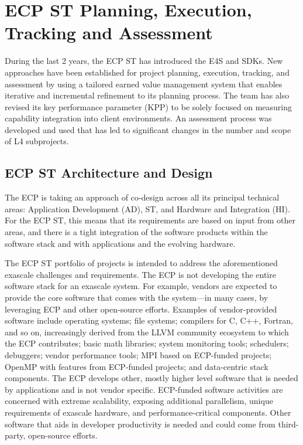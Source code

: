 \section{ECP ST Planning, Execution, Tracking and Assessment}\label{sect:PETA}
During the last 2 years, the ECP ST has introduced the E4S and SDKs.  New approaches have been established for project planning, execution, tracking, and assessment by using a tailored earned value management system that enables iterative and incremental refinement to its planning process.  The team has also revised its key performance parameter (KPP) to be solely focused on measuring capability integration into client environments.  An assessment process was developed and used that has led to significant changes in the number and scope of L4 subprojects.

\subsection{ECP ST Architecture and Design}
The ECP is taking an approach of co-design across all its principal technical areas: Application Development (AD), ST, and Hardware and Integration (HI). For the ECP ST, this means that its requirements are based on input from other areas, and there is a tight integration of the software products within the software stack and with applications and the evolving hardware. 

The ECP ST portfolio of projects is intended to address the aforementioned exascale challenges and requirements. The ECP is not developing the entire software stack for an exascale system. For example, vendors are expected to provide the core software that comes with the system---in many cases, by leveraging ECP and other open-source efforts. Examples of vendor-provided software include operating systems; file systems; compilers for C, C++, Fortran, and so on, increasingly derived from the LLVM community ecosystem to which the ECP contributes; basic math libraries; system monitoring tools; schedulers; debuggers; vendor performance tools; MPI based on ECP-funded projects; OpenMP with features from ECP-funded projects; and data-centric stack components. The ECP develops other, mostly higher level software that is needed by applications and is not vendor specific. ECP-funded software activities are concerned with extreme scalability, exposing additional parallelism, unique requirements of exascale hardware, and performance-critical components. Other software that aids in developer productivity is needed and could come from third-party, open-source efforts.

